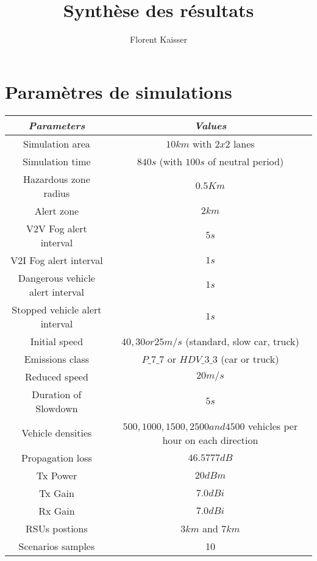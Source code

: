 \documentclass[a4paper,10pt]{report}
\title{Synthèse des résultats}
\author{Florent Kaisser}
\begin{document}
\maketitle

\begin{abstract}
\end{abstract}

\section*{Paramètres de simulations}

\begin{table}[!t]
\label{tab:parametres}
\begin{center}
\begin{tabular}{|c||c|}
  \hline
   \emph{Parameters}&\emph{Values}\\
\hline
Simulation area& $10 km$ with $2x2$ lanes\\
  \hline
Simulation time& $840 s$ (with  $100 s$ of neutral period)\\
\hline
Hazardous zone radius& $0.5 Km$\\
\hline
Alert zone & $2 km$\\
\hline
V2V Fog alert interval & $5s$\\
\hline
V2I Fog alert interval & $1s$\\
\hline
Dangerous vehicle alert interval & $1s$\\
\hline
Stopped vehicle alert interval & $1s$\\
\hline
Initial speed & $40, 30 or 25 m/s$   (standard, slow car, truck) \\
\hline
Emissions class& $P\_7\_7$ or $HDV\_3\_3$  (car or truck) \\
\hline
Reduced speed & $20m/s$\\
\hline
Duration of Slowdown & $5s$\\
\hline
Vehicle densities & $500,1000,1500,2500 and 4500 $ vehicles per hour on each direction\\ 
\hline
Propagation loss & $46.5777dB$\\
\hline
Tx Power & $20 dBm$\\
\hline
Tx Gain & $ 7.0 dBi$\\
\hline
Rx Gain & $7.0 dBi$\\
\hline
RSUs postions  & $3 km$ and $7 km$ \\
\hline
Scenarios samples & 10 \\
\hline
 
\end{tabular}
\end{center}
\end{table}
\end{document}
